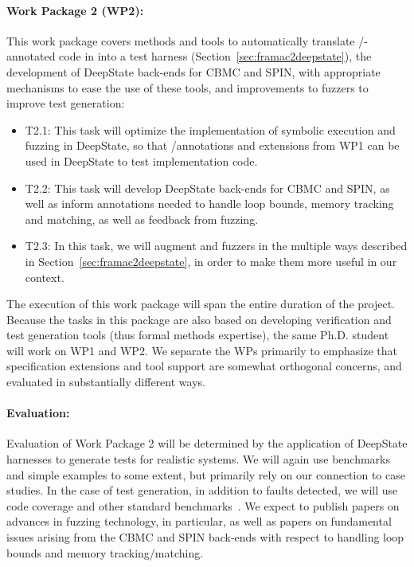 \paragraph{Work Package 2 (WP2):}  This work package covers
methods and tools to automatically translate \acsl/\eacsl-annotated code in
into a \deepstate test harness (Section~\ref{sec:framac2deepstate}),
the development of DeepState back-ends for CBMC and SPIN, with
appropriate mechanisms to ease the use of these tools, and
improvements to fuzzers to improve test generation:
\begin{itemize}[labelsep=3pt,leftmargin=12pt]
\item T2.1: This task will optimize the implementation of symbolic
  execution and fuzzing in DeepState, so that \acsl/\eacsl annotations
  and extensions from WP1 can be used in DeepState to test implementation code.
\item T2.2: This task will develop DeepState back-ends for CBMC and
  SPIN, as well as inform annotations needed to handle loop bounds,
  memory tracking and matching, as well as feedback from fuzzing.
\item T2.3: In this task, we will augment \deepstate and fuzzers in
  the multiple ways described in Section~\ref{sec:framac2deepstate},
  in order to make them more useful in our context.  
\end{itemize}

The execution of this work package will span the entire duration of the project.
Because the tasks in this package are also based on developing
verification and test generation tools (thus formal methods
expertise), the same Ph.D. student will work on WP1 and WP2.  We
separate the WPs primarily to emphasize that specification extensions
and tool support are somewhat orthogonal concerns, and evaluated in
substantially different ways.

\paragraph{Evaluation:} Evaluation of
Work Package 2 will be determined by the application
of DeepState harnesses to generate tests for realistic
systems.  We will again use benchmarks and simple examples to some
extent, but primarily rely on our connection to case studies.
In the case of test generation, in addition to faults
detected, we will use code coverage and other standard
benchmarks~\cite{FuzzerHicks}.  We expect to publish papers on
advances in fuzzing technology, in particular, as well as papers on
fundamental issues arising from the CBMC and SPIN back-ends with
respect to handling loop bounds and memory tracking/matching.


